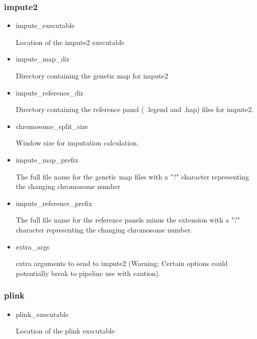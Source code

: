 \documentclass[a4paper,10pt]{article}
\begin{document}
                             \subsubsection{impute2}
                             \begin{itemize}
                             \item impute\_executable 

                             Location of the impute2 executable
                             \item impute\_map\_dir

                             Directory containing the genetic map for impute2
                             \item impute\_reference\_dir 

                             Directory containing the reference panel ( .legend and .hap) files for impute2.
                             \item chromosome\_split\_size

                             Window size for imputation calculation.
                             \item impute\_map\_prefix

                             The full file name for the genetic map files with a "?" character
                             representing the changing chromosome number
                             \item impute\_reference\_prefix

                             The full file name for the reference panels minus the extension with a
                             "?" character representing the changing chromosome number.
                             \item extra\_args

                             extra arguments to send to impute2 (Warning: Certain options could
                             potentially break to pipeline use with caution).
                             \end{itemize}
                             \subsubsection{plink}
                             \begin{itemize}
                             \item plink\_executable 

                             Location of the plink executable
                             \end{itemize}
\end{document}
